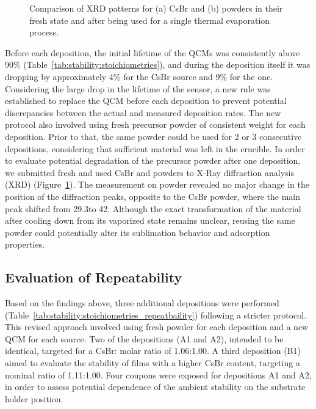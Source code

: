 \begin{figure}[htbp]
    \caption{Comparison of XRD patterns for (a) CsBr and (b)  powders in their fresh state and after being used for a single thermal evaporation process.}   
    \label{fig:stability:fresh_used_powders}
\end{figure}

Before each deposition, the initial lifetime of the QCMs was consistently above 90\% (Table~\ref{tab:stability:stoichiometries}), and during the deposition itself it was dropping by approximately 4\% for the CsBr source and 9\% for the  one. Considering the large drop in the lifetime of the  sensor, a new rule was established to replace the QCM before each deposition to prevent potential discrepancies between the actual and measured deposition rates. The new protocol also involved using fresh precursor powder of consistent weight for each deposition. Prior to that, the same powder could be used for 2 or 3 consecutive depositions, considering that sufficient material was left in the crucible. In order to evaluate potential degradation of the precursor powder after one deposition, we submitted fresh and used CsBr and  powders to X-Ray diffraction analysis (XRD)  (Figure~\ref{fig:stability:fresh_used_powders}). The measurement on  powder revealed no major change in the position of the diffraction peaks, opposite to the CsBr powder, where the main peak shifted from 29.3\degree to 42\degree. Although the exact transformation of the material after cooling down from its vaporized state remains unclear, reusing the same powder could potentially alter its sublimation behavior and adsorption properties.


\subsection{Evaluation of Repeatability}

Based on the findings above, three additional depositions were performed (Table~\ref{tab:stability:stoichiometries_repeatbaility}) following a stricter protocol. This revised approach involved using fresh powder for each deposition and a new QCM for each source. Two of the depositions (A1 and A2), intended to be identical, targeted for a CsBr: molar ratio of 1.06:1.00. A third deposition (B1) aimed to evaluate the stability of films with a higher CsBr content, targeting a nominal ratio of 1.11:1.00. Four coupons were exposed for depositions A1 and A2, in order to assess potential dependence of the ambient stability on the substrate holder position.


